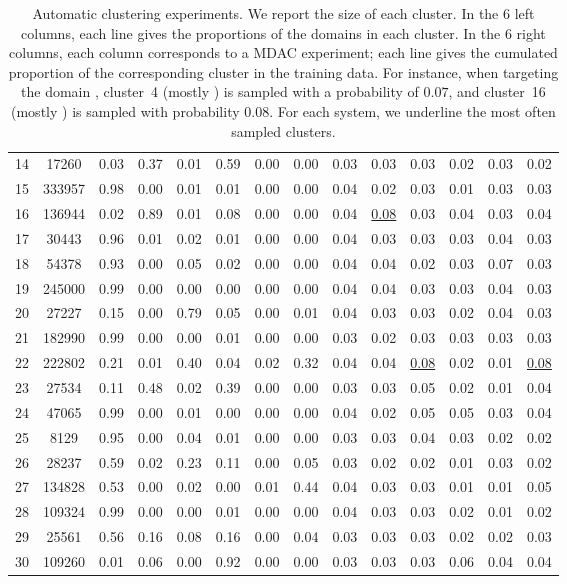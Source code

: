 \begin{table*}[htbp]
\begin{tabular}{|p{0.5cm}|*{7}{c|}|*{6}{c|}}
14&17260&0.03&0.37&0.01&0.59&0.00&0.00&0.03&0.03&0.03&0.02&0.03&0.02 \\
15&333957&0.98&0.00&0.01&0.01&0.00&0.00&0.04&0.02&0.03&0.01&0.03&0.03 \\
16&136944&0.02&0.89&0.01&0.08&0.00&0.00&0.04&\underline{0.08}&0.03&0.04&0.03&0.04 \\
17&30443&0.96&0.01&0.02&0.01&0.00&0.00&0.04&0.03&0.03&0.03&0.04&0.03 \\
18&54378&0.93&0.00&0.05&0.02&0.00&0.00&0.04&0.04&0.02&0.03&0.07&0.03 \\
19&245000&0.99&0.00&0.00&0.00&0.00&0.00&0.04&0.04&0.03&0.03&0.04&0.03 \\
20&27227&0.15&0.00&0.79&0.05&0.00&0.01&0.04&0.03&0.03&0.02&0.04&0.03 \\
21&182990&0.99&0.00&0.00&0.01&0.00&0.00&0.03&0.02&0.03&0.03&0.03&0.03 \\
22&222802&0.21&0.01&0.40&0.04&0.02&0.32&0.04&0.04&\underline{0.08}&0.02&0.01&\underline{0.08} \\
23&27534&0.11&0.48&0.02&0.39&0.00&0.00&0.03&0.03&0.05&0.02&0.01&0.04 \\
24&47065&0.99&0.00&0.01&0.00&0.00&0.00&0.04&0.02&0.05&0.05&0.03&0.04 \\
25&8129&0.95&0.00&0.04&0.01&0.00&0.00&0.03&0.03&0.04&0.03&0.02&0.02 \\
26&28237&0.59&0.02&0.23&0.11&0.00&0.05&0.03&0.02&0.02&0.01&0.03&0.02 \\
27&134828&0.53&0.00&0.02&0.00&0.01&0.44&0.04&0.03&0.03&0.01&0.01&0.05 \\
28&109324&0.99&0.00&0.00&0.01&0.00&0.00&0.04&0.03&0.03&0.02&0.01&0.02 \\
29&25561&0.56&0.16&0.08&0.16&0.00&0.04&0.03&0.03&0.03&0.02&0.02&0.03 \\
30&109260&0.01&0.06&0.00&0.92&0.00&0.00&0.03&0.03&0.03&0.06&0.04&0.04 \\
\hline
\end{tabular}
\caption{Automatic clustering experiments. We report the size of each cluster. In the 6 left columns, each line gives the proportions of the domains in each cluster. In the 6 right columns, each column corresponds to a MDAC experiment; each line gives the cumulated proportion of the corresponding cluster in the training data. For instance, when targeting the domain , cluster~4 (mostly ) is sampled with a probability of $0.07$, and cluster~16 (mostly ) is sampled with probability $0.08$. For each system, we underline the most often sampled clusters.}
\label{tab:automatic_domains-appendix}
\end{table*}

